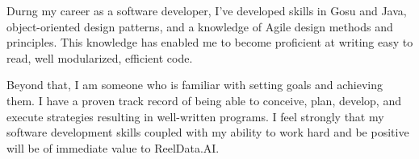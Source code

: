 Durng my career as a software developer, I’ve developed skills in Gosu and Java, object-oriented design patterns, and a knowledge of Agile design methods and principles. This knowledge has enabled me to become proficient at writing easy to read, well modularized, efficient code.

Beyond that, I am someone who is familiar with setting goals and achieving them. I have a proven track record of being able to conceive, plan, develop, and execute strategies resulting in well-written programs. I feel strongly that my software development skills coupled with my ability to work hard and be positive will be of immediate value to ReelData.AI.